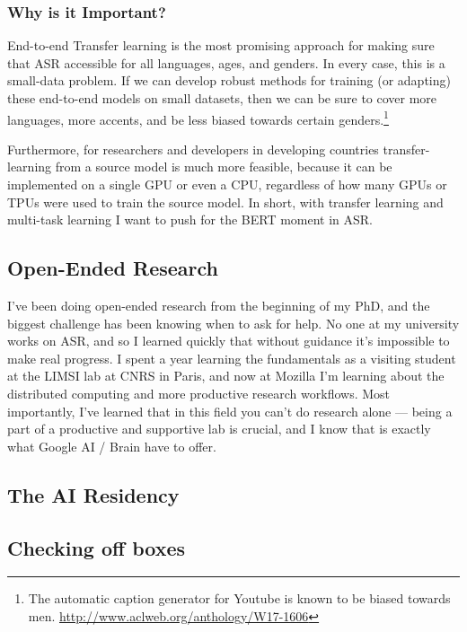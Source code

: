 \documentclass[12pt,a4paper]{article}
\begin{document}
\subsubsection*{Why is it Important?}

End-to-end Transfer learning is the most promising approach for making sure that ASR accessible for all languages, ages, and genders. In every case, this is a small-data problem. If we can develop robust methods for training (or adapting) these end-to-end models on small datasets, then we can be sure to cover more languages, more accents, and be less biased towards certain genders.\footnote{The automatic caption generator for Youtube is known to be biased towards men. \url{http://www.aclweb.org/anthology/W17-1606}}

Furthermore, for researchers and developers in developing countries transfer-learning from a source model is much more feasible, because it can be implemented on a single GPU or even a CPU, regardless of how many GPUs or TPUs were used to train the source model. In short, with transfer learning and multi-task learning I want to push for the BERT moment in ASR.

\subsection*{Open-Ended Research}
I've been doing open-ended research from the beginning of my PhD, and the biggest challenge has been knowing when to ask for help. No one at my university works on ASR, and so I learned quickly that without guidance it's impossible to make real progress. I spent a year learning the fundamentals as a visiting student at the LIMSI lab at CNRS in Paris, and now at Mozilla I'm learning about the distributed computing and more productive research workflows. Most importantly, I've learned that in this field you can't do research alone --- being a part of a productive and supportive lab is crucial, and I know that is exactly what Google AI / Brain have to offer.

\subsection*{The AI Residency}


\newpage

\subsection*{Checking off boxes}
\end{document}
